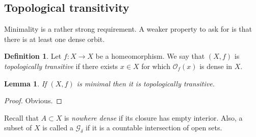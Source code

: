 \documentclass[12pt]{article}
\newtheorem{lemma}[theorem]{Lemma}
\newtheorem{proposition}[theorem]{Proposition}
\theoremstyle{definition}
\newtheorem{definition}[theorem]{Definition}
\theoremstyle{remark}
\begin{document}
%















\subsection{Topological transitivity}

Minimality is a rather strong requirement. A weaker property to ask for is that there is at least one dense orbit.

\begin{definition}
Let $f : X \to X$ be a homeomorphism.
We say that $(X,f)$ is {\it topologically transitive} if there exists $x \in X$ for which $\mathcal O_f(x)$ 
is dense in $X$.
\end{definition}

\begin{lemma}
If $(X,f)$ is minimal then it is topologically transitive.
\end{lemma}

\begin{proof}
Obvious.
\end{proof}

Recall that $A \subset X$ is {\it nowhere dense} if its closure has empty interior.
Also, a subset of $X$ is called a $\mathcal G_\delta$ if it is a countable intersection of open sets.
\end{document}
